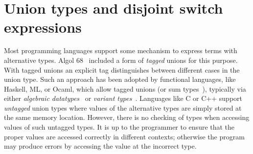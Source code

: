 



\section{Union types and disjoint switch expressions}


Most programming languages support some mechanism to express terms
with alternative types. Algol 68~\citep{van1969report,van2012revised} included a form of
\emph{tagged} unions for this purpose. With tagged unions
an explicit tag distinguishes between different cases in the
union type.
Such an approach has been adopted by functional languages, like Haskell, ML, or
Ocaml, which allow tagged unions (or sum types~\citep{pierce2002types}), typically via
either \emph{algebraic datatypes}~\citep{hope} or \emph{variant types}~\citep{garrigue98}.
Languages like C or C++ support \emph{untagged} union types where
values of the alternative types are simply stored at the same memory
location. However, there is no checking of types when accessing values of
such untagged types. It is up to the programmer to ensure that the proper
values are accessed correctly in different contexts; otherwise the
program may produce errors by accessing the value at the incorrect type.

